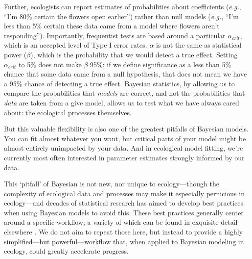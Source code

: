 \documentclass[11pt]{article}
\begin{document}
{%
Further, ecologists can report estimates of probabilities about coefficients (\emph{e.g.}, ``I'm 80\% certain the flowers open earlier'') rather than null models (\emph{e.g.}, ``I'm less than 5\% certain these data came from a model where flowers aren't responding''). Importantly, frequentist tests are based around a particular $\alpha_{crit}$, which is an accepted level of Type I error rates. $\alpha$ is not the same as statistical power ($\beta$), which is the probability that we would detect a true effect. Setting $\alpha_{crit}$ to 5\% does not make $\beta$ 95\%: if we define significance as a less than 5\% chance that some data came from a null hypothesis, that does not mean we have a 95\% chance of detecting a true effect. Bayesian statistics, by allowing us to compare the probabilities that \emph{models} are correct, and not the probabilities that \emph{data} are taken from a give model, allows us to test what we have always cared about: the ecological processes themselves.

But this valuable flexibility is also one of the greatest pitfalls of Bayesian models. You can fit almost whatever you want, but critical parts of your model might be almost entirely unimpacted by your data. And in ecological model fitting, we're currently most often interested in parameter estimates strongly informed by our data.

This `pitfall' of Bayesian is not new, nor unique to ecology---though the complexity of ecological data and processes may make it especially pernicious in ecology---and decades of statistical research has aimed to develop best practices when using Bayesian models to avoid this. These best practices generally center around a specific workflow; a variety of which can be found in exquisite detail elsewhere \citep{betanworkflow,grinsztajn2021,vandeschoot2021}. We do not aim to repeat those here, but instead to provide a highly simplified---but powerful---workflow that, when applied to Bayesian modeling in ecology, could greatly accelerate progress. %

}
\end{document}

